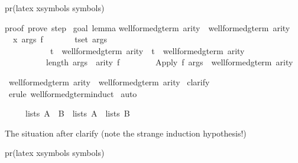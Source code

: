 \begin{isabellebody}
\begin{isamarkuptext}
pr(latex xsymbols symbols)

proof\ {\isacharparenleft}prove{\isacharparenright}{\isacharcolon}\ step\ {}\isanewline
\isanewline
goal\ {\isacharparenleft}lemma{\isacharparenright}{\isacharcolon}\isanewline
well{\isacharunderscore}formed{\isacharunderscore}gterm\ arity\ {\isasymsubseteq}\ well{\isacharunderscore}formed{\isacharunderscore}gterm{\isacharprime}\ arity\isanewline
\ {}{\isachardot}\ {\isasymAnd}x\ args\ f{\isachardot}\isanewline
\ \ \ \ \ \ \ {\isasymlbrakk}{\isasymforall}t{\isasymin}set\ args{\isachardot}\isanewline
\ \ \ \ \ \ \ \ \ \ \ t\ {\isasymin}\ well{\isacharunderscore}formed{\isacharunderscore}gterm\ arity\ {\isasymand}\ t\ {\isasymin}\ well{\isacharunderscore}formed{\isacharunderscore}gterm{\isacharprime}\ arity{\isacharsemicolon}\isanewline
\ \ \ \ \ \ \ \ \ \ length\ args\ {\isacharequal}\ arity\ f{\isasymrbrakk}\isanewline
\ \ \ \ \ \ \ {\isasymLongrightarrow}\ Apply\ f\ args\ {\isasymin}\ well{\isacharunderscore}formed{\isacharunderscore}gterm{\isacharprime}\ arity%
\end{isamarkuptext}%
\ {\isachardoublequote}well{\isacharunderscore}formed{\isacharunderscore}gterm{\isacharprime}\ arity\ {\isasymsubseteq}\ well{\isacharunderscore}formed{\isacharunderscore}gterm\ arity{\isachardoublequote}\isanewline
{}\ clarify\isanewline
{}\ {\isacharparenleft}erule\ well{\isacharunderscore}formed{\isacharunderscore}gterm{\isacharprime}{\isachardot}induct{\isacharparenright}\isanewline
{}\ auto\isanewline
{}%
\begin{isamarkuptext}%
\begin{isabelle}%
\ \ \ \ \ lists\ {\isacharparenleft}A\ {\isasyminter}\ B{\isacharparenright}\ {\isacharequal}\ lists\ A\ {\isasyminter}\ lists\ B%
\end{isabelle}

The situation after clarify (note the strange induction hypothesis!)

pr(latex xsymbols symbols)


\end{isamarkuptext}
\end{isabellebody}
